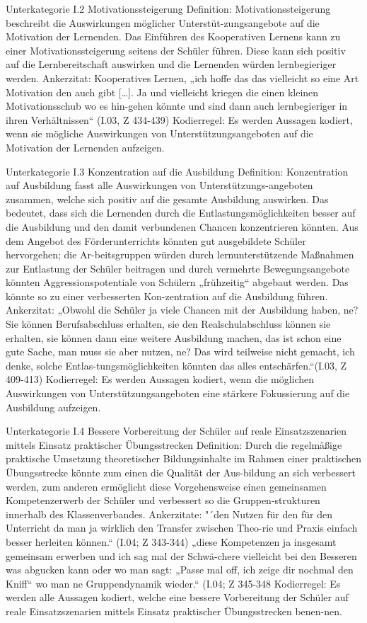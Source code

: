 Unterkategorie I.2 Motivationssteigerung 
Definition: Motivationssteigerung beschreibt die Auswirkungen möglicher Unterstüt-zungsangebote auf die Motivation der Lernenden. Das Einführen des Kooperativen Lernens kann zu einer Motivationssteigerung seitens der Schüler führen. Diese kann sich positiv auf die Lernbereitschaft auswirken und die Lernenden würden lernbegieriger werden.
Ankerzitat: Kooperatives Lernen, „ich hoffe das das vielleicht so eine Art Motivation den auch gibt […]. Ja und vielleicht kriegen die einen kleinen Motivationsschub wo es hin-gehen könnte und sind dann auch lernbegieriger in ihren Verhältnissen“ (I.03, Z 434-439)
Kodierregel: Es werden Aussagen kodiert, wenn sie mögliche Auswirkungen von Unterstützungsangeboten auf die Motivation der Lernenden aufzeigen.

Unterkategorie I.3 Konzentration auf die Ausbildung 
Definition: Konzentration auf Ausbildung fasst alle Auswirkungen von Unterstützungs-angeboten zusammen, welche sich positiv auf die gesamte Ausbildung auswirken. Das bedeutet, dass sich die Lernenden durch die Entlastungsmöglichkeiten besser auf die Ausbildung und den damit verbundenen Chancen konzentrieren könnten. Aus dem Angebot des Förderunterrichts könnten gut ausgebildete Schüler hervorgehen; die Ar-beitsgruppen würden durch lernunterstützende Maßnahmen zur Entlastung der Schüler beitragen und durch vermehrte Bewegungsangebote könnten Aggressionspotentiale von Schülern „frühzeitig“ abgebaut werden. Das könnte so zu einer verbesserten Kon-zentration auf die Ausbildung führen.
Ankerzitat: „Obwohl die Schüler ja viele Chancen mit der Ausbildung haben, ne? Sie können Berufsabschluss erhalten, sie den Realschulabschluss können sie erhalten, sie können dann eine weitere Ausbildung machen, das ist schon eine gute Sache, man muss sie aber nutzen, ne? Das wird teilweise nicht gemacht, ich denke, solche Entlas-tungsmöglichkeiten könnten das alles entschärfen.“(I.03, Z 409-413)
Kodierregel: Es werden Aussagen kodiert, wenn die möglichen Auswirkungen von Unterstützungsangeboten eine stärkere Fokussierung auf die Ausbildung aufzeigen. 

Unterkategorie I.4 Bessere Vorbereitung der Schüler auf reale Einsatzszenarien mittels Einsatz praktischer Übungsstrecken
Definition: Durch die regelmäßige praktische Umsetzung theoretischer Bildungsinhalte im Rahmen einer praktischen Übungsstrecke könnte zum einen die Qualität der Aus-bildung an sich verbessert werden, zum anderen ermöglicht diese Vorgehensweise einen gemeinsamen Kompetenzerwerb der Schüler und verbessert so die Gruppen-strukturen innerhalb des Klassenverbandes.
Ankerzitate: 
"´den Nutzen für den für den Unterricht da man ja wirklich den Transfer zwischen Theo-rie und Praxis einfach besser herleiten können.“ (I.04; Z 343-344)
„diese Kompetenzen ja insgesamt gemeinsam erwerben und ich sag mal der Schwä-chere vielleicht bei den Besseren was abgucken kann oder wo man sagt: „Passe mal off, ich zeige dir nochmal den Kniff“ wo man ne Gruppendynamik wieder.“ (I.04; Z 345-348
Kodierregel:  Es werden alle Aussagen kodiert, welche eine bessere Vorbereitung der Schüler auf reale Einsatzszenarien mittels Einsatz praktischer Übungsstrecken benen-nen.
